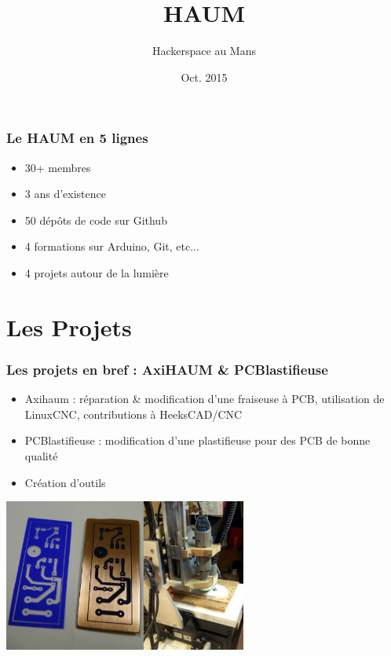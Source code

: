 \documentclass[10pt, compress]{beamer}
\title{HAUM}
\subtitle{\alert{H}ackerspace \alert{au M}ans}
\date{Oct. 2015}
\author{}
\institute{HAUM}
\begin{document}
\maketitle

\begin{frame}[fragile]
	\frametitle{Le HAUM en 5 lignes}

	\begin{itemize}
		\item \alert{30+} membres
		\item \alert{3 ans} d'existence
		\item \alert{50} dépôts de code sur Github
		\item \alert{4} formations sur Arduino, Git, etc...
		\item \alert{4} projets autour de la lumière
	\end{itemize}
\end{frame}

\section{Les Projets}

\begin{frame}[fragile]
	\frametitle{Les projets en bref : AxiHAUM \& PCBlastifieuse}

	\begin{itemize}
		\item \alert{Axihaum} : réparation \& modification d'une fraiseuse à PCB, utilisation de LinuxCNC, contributions à HeeksCAD/CNC
		\item \alert{PCBlastifieuse} : modification d'une plastifieuse pour des PCB de bonne qualité
		\item Création d'outils
	\end{itemize}

	\begin{center}
		\includegraphics[width=0.6\textwidth]{axihaum_pcb.png}
	\end{center}
\end{frame}
\end{document}
